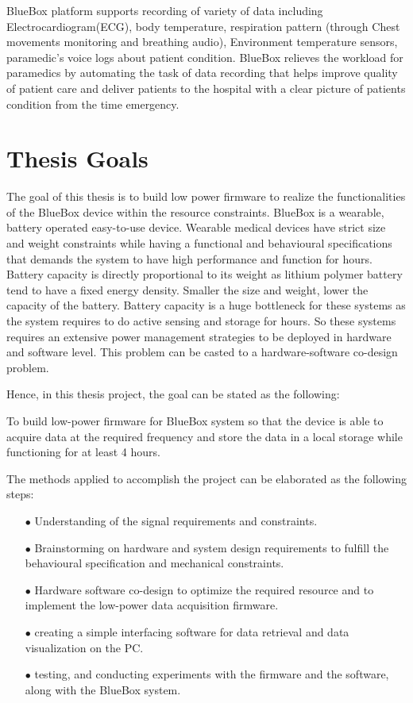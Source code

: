 \hspace{10mm}BlueBox platform supports recording of variety of data including Electrocardiogram(ECG), body temperature, respiration pattern (through Chest movements monitoring and breathing audio), Environment temperature sensors, paramedic’s voice logs about patient condition. BlueBox relieves the workload for paramedics by automating the task of data recording that helps improve quality of patient care and deliver patients to the hospital with a clear picture of patients condition from the time emergency. 

\section{Thesis Goals}
The goal of this thesis is to build low power firmware to realize the functionalities of the BlueBox device within the resource constraints. BlueBox is a wearable, battery operated easy-to-use device. Wearable medical devices have strict size and weight constraints while having a functional and behavioural specifications that demands the system to have high performance and function for hours. Battery capacity is directly proportional to its weight as lithium polymer battery tend to have a fixed energy density. Smaller the size and weight, lower the capacity of the battery. Battery capacity is a huge bottleneck for these systems as the system requires to do active sensing and storage for hours. So these systems requires an extensive power management strategies to be deployed in hardware and software level. This problem can be casted to a hardware-software co-design problem.

Hence, in this thesis project, the goal can be stated as the following:

 \hspace{10mm}To build low-power firmware for BlueBox system so that the device is able to acquire data at the required frequency and store the data in a local storage while functioning for at least 4 hours. 
 
 The methods applied to accomplish the project can be elaborated as the following steps:
 \begin{itemize}
 	\item[$\bullet$] Understanding of the signal requirements and constraints. 
 	
 	\item[$\bullet$] Brainstorming on hardware and system design requirements to fulfill the behavioural specification and mechanical constraints.
 	
 	\item[$\bullet$] Hardware software co-design to optimize the required resource and to implement the low-power data acquisition firmware.
 	
 	\item[$\bullet$] creating a simple interfacing software for data retrieval and data visualization on the PC.
 	
 	\item[$\bullet$] testing, and conducting experiments with the firmware and the software,
 	along with the BlueBox system.
 \end{itemize}
 
